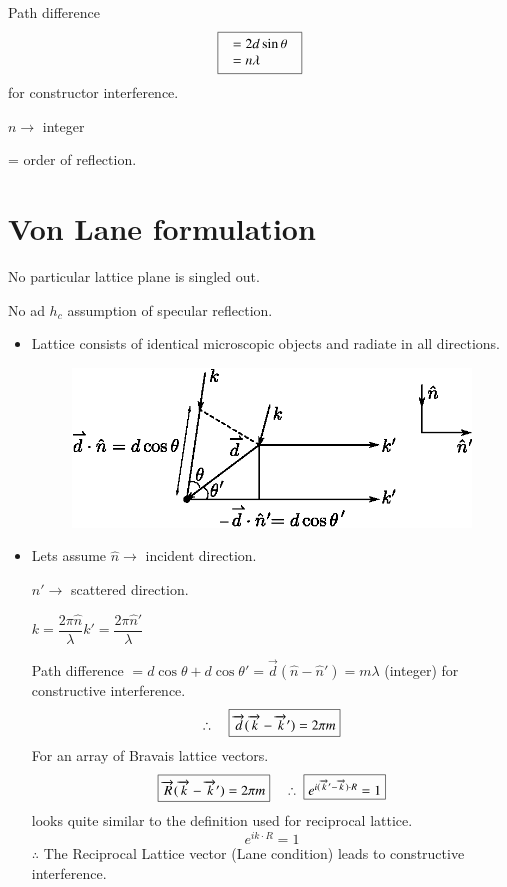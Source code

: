 Path difference
$$
\fbox{
$\begin{array}{l}
= 2d \sin\theta\\
= n\lambda
\end{array}
$
}
$$
for constructor interference.

$n\to$ integer

= order of reflection.

\section*{Von Lane formulation}

No particular lattice plane is singled out.

No ad $h_{c}$ assumption of specular reflection.
\begin{itemize}
\item Lattice consists of identical microscopic objects and radiate in all directions.
\begin{figure}[H]
\centering
\includegraphics{images/lecture14/fig4.eps}
\end{figure}

\item Lets assume $\widehat{n}\to$ incident direction.

$\widehat{n}'\to$ scattered direction.

$k=\dfrac{2\pi\widehat{n}}{\lambda}$\quad $k'=\dfrac{2\pi\widehat{n}'}{\lambda}$

Path difference $=d\cos\theta+d\cos \theta'=\overrightarrow{d}(\widehat{n}-\widehat{n}')=m\lambda$ (integer) for constructive interference.
$$
\therefore\quad \fbox{$\overrightarrow{d}(\overrightarrow{k}-\overrightarrow{k}')=2\pi m$}
$$
For an array of Bravais lattice vectors.
$$
\fbox{$\overrightarrow{R}(\overrightarrow{k}-\overrightarrow{k}')=2\pi m$}\quad \therefore \ \fbox{$e^{i(\overrightarrow{k}'-\overrightarrow{k})\cdot R}=1$}
$$
looks quite similar to the definition used for reciprocal lattice.
$$
e^{ik\cdot R}=1
$$
$\therefore$ The Reciprocal Lattice vector  (Lane condition) leads to constructive interference.
\end{itemize}

